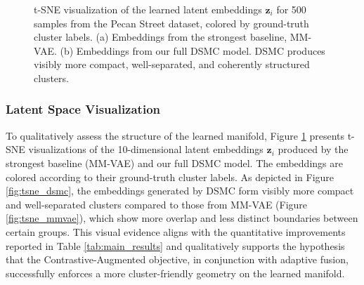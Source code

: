 \documentclass[journal]{IEEEtran}
\begin{document}
\begin{figure}[h!]
\centering
{}
\hfill %
\caption{t-SNE visualization of the learned latent embeddings $\mathbf{z}_i$ for 500 samples from the Pecan Street dataset, colored by ground-truth cluster labels. (a) Embeddings from the strongest baseline, MM-VAE. (b) Embeddings from our full DSMC model. DSMC produces visibly more compact, well-separated, and coherently structured clusters.}
\label{fig:tsne}
\end{figure}

\subsubsection{Latent Space Visualization}
To qualitatively assess the structure of the learned manifold, Figure \ref{fig:tsne} presents t-SNE \cite{van2008visualizing} visualizations of the 10-dimensional latent embeddings $\mathbf{z}_i$ produced by the strongest baseline (MM-VAE) and our full DSMC model. The embeddings are colored according to their ground-truth cluster labels. As depicted in Figure \ref{fig:tsne_dsmc}, the embeddings generated by DSMC form visibly more compact and well-separated clusters compared to those from MM-VAE (Figure \ref{fig:tsne_mmvae}), which show more overlap and less distinct boundaries between certain groups. This visual evidence aligns with the quantitative improvements reported in Table \ref{tab:main_results} and qualitatively supports the hypothesis that the Contrastive-Augmented objective, in conjunction with adaptive fusion, successfully enforces a more cluster-friendly geometry on the learned manifold.
\end{document}
